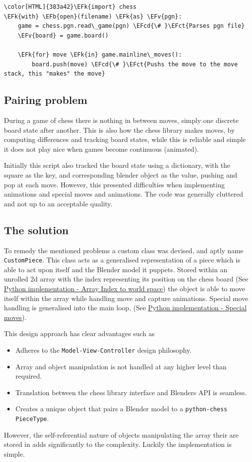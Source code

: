\documentclass[11pt]{article}
\newcommand{\EFk}[1]{\textcolor{EFk}{#1}} %
\newcommand{\EFb}[1]{\textcolor{EFb}{#1}} %
\newcommand{\EFct}[1]{\textcolor{EFct}{#1}} %
\newcommand{\EFv}[1]{\textcolor{EFv}{#1}} %
\newcommand{\EFcd}[1]{\textcolor{EFcd}{#1}} %
\begin{document}
\begin{Code}
\begin{Verbatim}[]
\color[HTML]{383a42}\EFk{import} chess
\EFk{with} \EFb{open}(filename) \EFk{as} \EFv{pgn}:
    game = chess.pgn.read\_game(pgn) \EFcd{\# }\EFct{Parses pgn file}
    \EFv{board} = game.board()

    \EFk{for} move \EFk{in} game.mainline\_moves():
        board.push(move) \EFcd{\# }\EFct{Pushs the move to the move stack, this "makes" the move}
\end{Verbatim}
\end{Code}
\subsection{Pairing problem}
\label{sec:org3aaa754}
During a game of chess there is nothing in between moves, simply one discrete
board state after another. This is also how the chess library makes moves, by
computing differences and tracking board states, while this is reliable and
simple it does not play nice when games become continuous (animated).

Initially this script also tracked the board state using a dictionary, with the
square as the key, and corresponding blender object as the value, pushing and
pop at each move. However, this presented difficulties when implementing
animations and special moves and animations. The code was generally cluttered
and not up to an acceptable quality.
\subsection{The solution}
\label{sec:org7f40e14}
To remedy the mentioned problems a custom class was devised, and aptly name
\texttt{CustomPiece}. This class acts as a generalised representation of a piece which
is able to act upon itself and the Blender model it puppets. Stored within an
unrolled 2d array with the index representing its position on the chess board
(See \hyperref[sec:org027462f]{Python implementation - Array Index to world space}) the object is able to
move itself within the array while handling move and capture animations. Special
move handling is generalised into the main loop, (See \hyperref[sec:org5b009c3]{Python implementation -
Special moves}).

This design approach has clear advantages such as
\begin{itemize}
\item Adheres to the \texttt{Model-View-Controller} design philosophy.
\item Array and object manipulation is not handled at any higher level than required.
\item Translation between the chess library interface and Blenders API is seamless.
\item Creates a unique object that pairs a Blender model to a \texttt{python-chess}
\texttt{PieceType}.
\end{itemize}
However, the self-referential nature of objects manipulating the array their
are stored in adds significantly to the complexity. Luckily the implementation is
simple.
\end{document}
